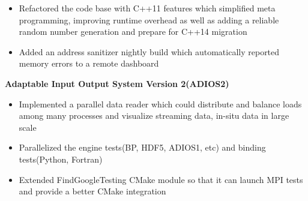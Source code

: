 \begin{cventries}
{\begin{cvitems}
\begin{itemize}
              \item {Refactored the code base with C++11 features which simplified meta programming, improving runtime overhead as well as adding a reliable random number generation and prepare for C++14 migration}
              \item {Added an address sanitizer nightly build which automatically reported memory errors to a remote dashboard\\}
          \end{itemize}
        \item {\fontsize{10pt}{1em}\bodyfont\bfseries\color{darktext}Adaptable Input Output System Version 2(ADIOS2)}
          \begin{itemize}
              \item {Implemented a parallel data reader which could distribute and balance loads among many processes and visualize streaming data, in-situ data in large scale}
              \item {Parallelized the engine tests(BP, HDF5, ADIOS1, etc) and binding tests(Python, Fortran)}
              \item {Extended FindGoogleTesting CMake module so that it can launch MPI tests and provide a better CMake integration}
          \end{itemize}
      \end{cvitems}
    }


\end{cventries}
